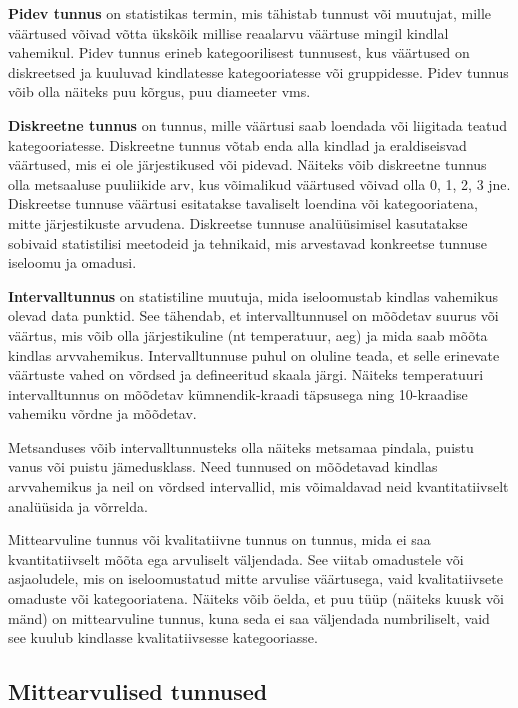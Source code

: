 \documentclass[
]{book}
\begin{document}
\textbf{Pidev tunnus} on statistikas termin, mis tähistab tunnust või muutujat, mille väärtused võivad võtta ükskõik millise reaalarvu väärtuse mingil kindlal vahemikul. Pidev tunnus erineb kategoorilisest tunnusest, kus väärtused on diskreetsed ja kuuluvad kindlatesse kategooriatesse või gruppidesse. Pidev tunnus võib olla näiteks puu kõrgus, puu diameeter vms.

\textbf{Diskreetne tunnus} on tunnus, mille väärtusi saab loendada või liigitada teatud kategooriatesse. Diskreetne tunnus võtab enda alla kindlad ja eraldiseisvad väärtused, mis ei ole järjestikused või pidevad. Näiteks võib diskreetne tunnus olla metsaaluse puuliikide arv, kus võimalikud väärtused võivad olla 0, 1, 2, 3 jne. Diskreetse tunnuse väärtusi esitatakse tavaliselt loendina või kategooriatena, mitte järjestikuste arvudena. Diskreetse tunnuse analüüsimisel kasutatakse sobivaid statistilisi meetodeid ja tehnikaid, mis arvestavad konkreetse tunnuse iseloomu ja omadusi.

\textbf{Intervalltunnus} on statistiline muutuja, mida iseloomustab kindlas vahemikus olevad data punktid. See tähendab, et intervalltunnusel on mõõdetav suurus või väärtus, mis võib olla järjestikuline (nt temperatuur, aeg) ja mida saab mõõta kindlas arvvahemikus. Intervalltunnuse puhul on oluline teada, et selle erinevate väärtuste vahed on võrdsed ja defineeritud skaala järgi. Näiteks temperatuuri intervalltunnus on mõõdetav kümnendik-kraadi täpsusega ning 10-kraadise vahemiku võrdne ja mõõdetav.

Metsanduses võib intervalltunnusteks olla näiteks metsamaa pindala, puistu vanus või puistu jämedusklass. Need tunnused on mõõdetavad kindlas arvvahemikus ja neil on võrdsed intervallid, mis võimaldavad neid kvantitatiivselt analüüsida ja võrrelda.

Mittearvuline tunnus või kvalitatiivne tunnus on tunnus, mida ei saa kvantitatiivselt mõõta ega arvuliselt väljendada. See viitab omadustele või asjaoludele, mis on iseloomustatud mitte arvulise väärtusega, vaid kvalitatiivsete omaduste või kategooriatena. Näiteks võib öelda, et puu tüüp (näiteks kuusk või mänd) on mittearvuline tunnus, kuna seda ei saa väljendada numbriliselt, vaid see kuulub kindlasse kvalitatiivsesse kategooriasse.

\subsection{Mittearvulised tunnused}\label{mittearvulised-tunnused}
\end{document}
